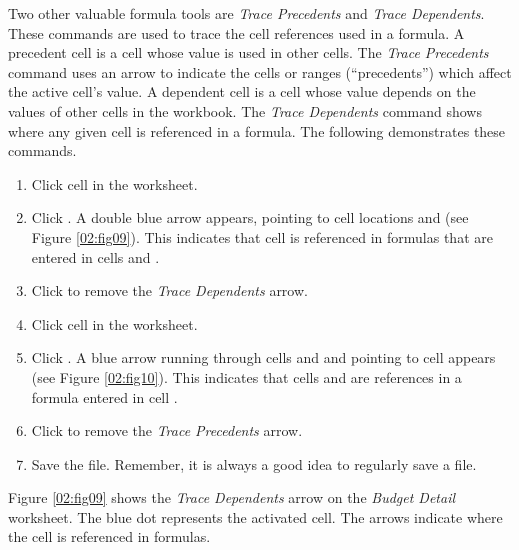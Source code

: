 Two other valuable formula tools are \textit{Trace Precedents} and \textit{Trace Dependents}. These commands are used to trace the cell references used in a formula. A precedent cell is a cell whose value is used in other cells. The \textit{Trace Precedents} command uses an arrow to indicate the cells or ranges (``precedents'') which affect the active cell's value. A dependent cell is a cell whose value depends on the values of other cells in the workbook. The \textit{Trace Dependents} command shows where any given cell is referenced in a formula. The following demonstrates these commands.

\begin{enumerate}
	\item Click cell  in the  worksheet.
	\item Click . A double blue arrow appears, pointing to cell locations  and  (see Figure \ref{02:fig09}). This indicates that cell  is referenced in formulas that are entered in cells  and .
	\item Click  to remove the \textit{Trace Dependents} arrow.
	\item Click cell  in the  worksheet.
	\item Click . A blue arrow running through cells  and  and pointing to cell  appears (see Figure \ref{02:fig10}). This indicates that cells  and  are references in a formula entered in cell .
	\item Click  to remove the \textit{Trace Precedents} arrow.
	\item Save the  file. Remember, it is always a good idea to regularly save a file.
\end{enumerate}

Figure \ref{02:fig09} shows the \textit{Trace Dependents} arrow on the \textit{Budget Detail} worksheet. The blue dot represents the activated cell. The arrows indicate where the cell is referenced in formulas.

